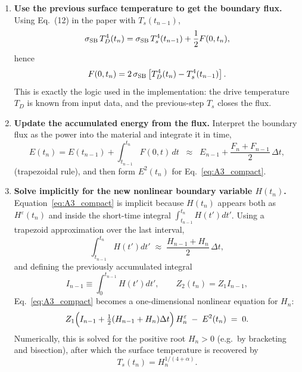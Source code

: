 \documentclass{article}
\begin{document}
\begin{enumerate}
    \item \textbf{Use the previous surface temperature to get the boundary flux.}
    Using Eq.~(12) in the paper with $T_s(t_{n-1})$,
    \begin{equation}
    \sigma_{\rm SB}\,T_D^4(t_n)
    =
    \sigma_{\rm SB}\,T_s^4(t_{n-1}) + \frac{1}{2}F(0,t_n),
    \end{equation}
    hence
    \begin{equation}
    F(0,t_n) = 2\,\sigma_{\rm SB}\left[T_D^4(t_n)-T_s^4(t_{n-1})\right].
    \label{eq:flux_update}
    \end{equation}
    This is exactly the logic used in the implementation: the drive temperature $T_D$ is known from input data, and the previous-step $T_s$ closes the flux.

    \item \textbf{Update the accumulated energy from the flux.}
    Interpret the boundary flux as the power into the material and integrate it in time,
    \begin{equation}
    E(t_n) = E(t_{n-1}) + \int_{t_{n-1}}^{t_n} F(0,t)\,dt
    \;\;\approx\;\;
    E_{n-1} + \frac{F_n+F_{n-1}}{2}\,\Delta t,
    \label{eq:E_trap}
    \end{equation}
    (trapezoidal rule), and then form $E^2(t_n)$ for Eq.~\eqref{eq:A3_compact}.

    \item \textbf{Solve implicitly for the new nonlinear boundary variable $H(t_n)$.}
    Equation~\eqref{eq:A3_compact} is implicit because $H(t_n)$ appears both as $H^\varepsilon(t_n)$ and inside the short-time integral $\int_{t_{n-1}}^{t_n}H(t')dt'$.
    Using a trapezoid approximation over the last interval,
    \begin{equation}
    \int_{t_{n-1}}^{t_n} H(t')dt' \;\approx\; \frac{H_{n-1}+H_n}{2}\,\Delta t,
    \label{eq:I_last_trap}
    \end{equation}
    and defining the previously accumulated integral
    \begin{equation}
    I_{n-1}\equiv \int_0^{t_{n-1}} H(t')dt',
    \qquad
    Z_2(t_n)=Z_1 I_{n-1},
    \end{equation}
    Eq.~\eqref{eq:A3_compact} becomes a one-dimensional nonlinear equation for $H_n$:
    \begin{equation}
    Z_1\Bigl(I_{n-1}+\tfrac{1}{2}(H_{n-1}+H_n)\Delta t\Bigr)\,H_n^{\varepsilon}
    \;-\;
    E^2(t_n)
    \;=\;0.
    \label{eq:implicit_H_equation}
    \end{equation}
    Numerically, this is solved for the positive root $H_n>0$ (e.g.\ by bracketing and bisection), after which the surface temperature is recovered by
    \begin{equation}
    T_s(t_n) = H_n^{1/(4+\alpha)}.
    \end{equation}


\end{enumerate}
\end{document}
